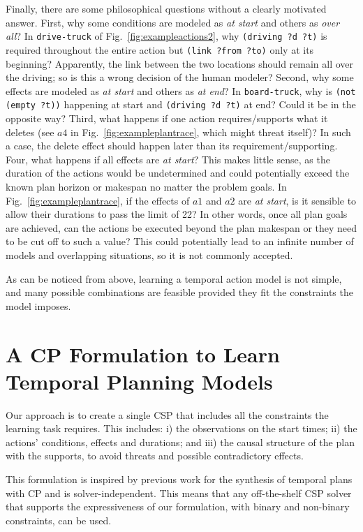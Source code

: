 \documentclass[runningheads]{llncs}
\begin{document}
Finally, there are some philosophical questions without a clearly motivated answer. First, why some conditions are modeled as \emph{at start} and others as \emph{over all}? In \texttt{drive-truck} of Fig.~\ref{fig:exampleactions2}, why \texttt{(driving ?d ?t)} is required throughout the entire action but \texttt{(link ?from ?to)} only at its beginning? Apparently, the link between the two locations should remain all over the driving; so is this a wrong decision of the human modeler?
Second, why some effects are modeled as \emph{at start} and others as \emph{at end}? In \texttt{board-truck}, why is \texttt{(not (empty ?t))} happening at start and \texttt{(driving ?d ?t)} at end? Could it be in the opposite way?
Third, what happens if one action requires/supports what it deletes (see $a4$ in Fig.~\ref{fig:exampleplantrace}, which might threat itself)? In such a case, the delete effect should happen later than its requirement/supporting.
Four, what happens if all effects are \emph{at start}? This makes little sense, as the duration of the actions would be undetermined and could potentially exceed the known plan horizon or makespan no matter the problem goals. In Fig.~\ref{fig:exampleplantrace}, if the effects of $a1$ and $a2$ are \emph{at start}, is it sensible to allow their durations to pass the limit of 22? In other words, once all plan goals are achieved, can the actions be executed beyond the plan makespan or they need to be cut off to such a value? This could potentially lead to an infinite number of models and overlapping situations, so it is not commonly accepted.

As can be noticed from above, learning a temporal action model is not simple, and many possible combinations are feasible provided they fit the constraints the model imposes.



\section{A CP Formulation to Learn Temporal Planning Models}
\label{sec:CPformulation}

Our approach is to create a single CSP that includes all the constraints the learning task requires. This includes: i) the observations on the start times; ii) the actions' conditions, effects and durations; and iii) the causal structure of the plan with the supports, to avoid threats and possible contradictory effects.

This formulation is inspired by previous work for the synthesis of temporal plans with CP\cite{garrido2009constraint} and is solver-independent. This means that any off-the-shelf CSP solver that supports the expressiveness of our formulation, with binary and non-binary constraints, can be used.
\end{document}
